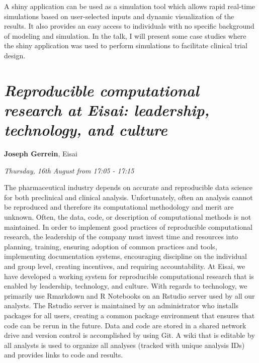 \documentclass[]{book}
\theoremstyle{definition}
\theoremstyle{definition}
\theoremstyle{definition}
\theoremstyle{remark}
\begin{document}
A shiny application can be used as a simulation tool which allows rapid
real-time simulations based on user-selected inputs and dynamic
visualization of the results. It also provides an easy access to
individuals with no specific background of modeling and simulation. In
the talk, I will present some case studies where the shiny application
was used to perform simulations to facilitate clinical trial design.

\hypertarget{reproducible-computational-research-at-eisai-leadership-technology-and-culture}{%
\section{\texorpdfstring{\emph{Reproducible computational research at
Eisai: leadership, technology, and
culture}}{Reproducible computational research at Eisai: leadership, technology, and culture}}\label{reproducible-computational-research-at-eisai-leadership-technology-and-culture}}

\textbf{Joseph Gerrein}, Eisai

\emph{Thursday, 16th August from 17:05 - 17:15}

The pharmaceutical industry depends on accurate and reproducible data
science for both preclinical and clinical analysis. Unfortunately, often
an analysis cannot be reproduced and therefore its computational
methodology and merit are unknown. Often, the data, code, or description
of computational methods is not maintained. In order to implement good
practices of reproducible computational research, the leadership of the
company must invest time and resources into planning, training, ensuring
adoption of common practices and tools, implementing documentation
systems, encouraging discipline on the individual and group level,
creating incentives, and requiring accountability. At Eisai, we have
developed a working system for reproducible computational research that
is enabled by leadership, technology, and culture. With regards to
technology, we primarily use Rmarkdown and R Notebooks on an Rstudio
server used by all our analysts. The Rstudio server is maintained by an
administrator who installs packages for all users, creating a common
package environment that ensures that code can be rerun in the future.
Data and code are stored in a shared network drive and version control
is accomplished by using Git. A wiki that is editable by all analysts is
used to organize all analyses (tracked with unique analysis IDs) and
provides links to code and results.
\end{document}
